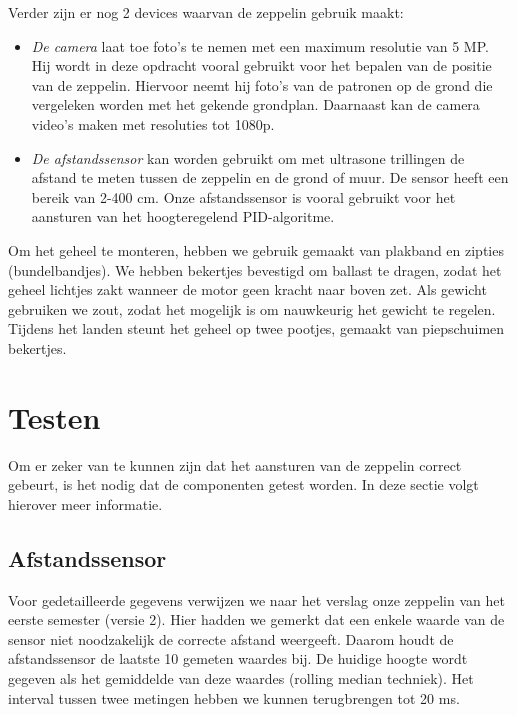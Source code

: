 \documentclass[tt]{penoverslag}
\begin{document}
Verder zijn er nog 2 devices waarvan de zeppelin gebruik maakt:
\begin{itemize}
\item \emph{De camera} laat toe foto's te nemen met een maximum resolutie van 5 MP. Hij wordt in deze opdracht vooral gebruikt voor het bepalen van de positie van de zeppelin. Hiervoor neemt hij foto's van de patronen op de grond die vergeleken worden met het gekende grondplan. Daarnaast kan de camera video's maken met resoluties tot 1080p.
\item \emph{De afstandssensor} kan worden gebruikt om met ultrasone trillingen de afstand te meten tussen de zeppelin en de grond of muur. De sensor heeft een bereik van 2-400 cm. Onze afstandssensor is vooral gebruikt voor het aansturen van het hoogteregelend PID-algoritme.  \\
\end{itemize}


Om het geheel te monteren, hebben we gebruik gemaakt van plakband en zipties (bundelbandjes). We hebben bekertjes bevestigd om ballast te dragen, zodat het geheel lichtjes zakt wanneer de motor geen kracht naar boven zet. Als gewicht gebruiken we zout, zodat het mogelijk is om nauwkeurig het gewicht te regelen. Tijdens het landen steunt het geheel op twee pootjes, gemaakt van piepschuimen bekertjes. \\

\section{Testen}

Om er zeker van te kunnen zijn dat het aansturen van de zeppelin correct gebeurt, is het nodig dat de componenten getest worden. In deze sectie volgt hierover meer informatie.

\subsection{Afstandssensor}
Voor gedetailleerde gegevens verwijzen we naar het verslag onze zeppelin van het eerste semester (versie 2). Hier hadden we gemerkt dat een enkele waarde van de sensor niet noodzakelijk de correcte afstand weergeeft. Daarom houdt de afstandssensor de laatste 10 gemeten waardes bij. De huidige hoogte wordt gegeven als het gemiddelde van deze waardes (rolling median techniek). Het interval tussen twee metingen hebben we kunnen terugbrengen tot 20 ms.
\end{document}
